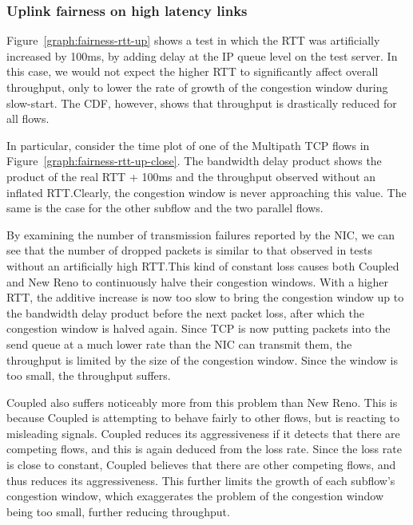 \subsubsection{Uplink fairness on high latency links}
\label{sec:fairness:latency}

Figure~\ref{graph:fairness-rtt-up} shows a test in which the RTT was
artificially increased by 100ms, by adding delay at the IP queue level on the
test server. In this case, we would not expect the higher RTT to significantly
affect overall throughput, only to lower the rate of growth of the congestion
window during slow-start. The CDF, however, shows that throughput is drastically
reduced for all flows.

In particular, consider the time plot of one of the Multipath TCP flows in
Figure~\ref{graph:fairness-rtt-up-close}. The bandwidth delay product shows the
product of the real RTT + 100ms and the throughput observed without an inflated
RTT.\@ Clearly, the congestion window is never approaching this value. The same
is the case for the other subflow and the two parallel flows.

By examining the number of transmission failures reported by the NIC, we can see
that the number of dropped packets is similar to that observed in tests without
an artificially high RTT.\@ This kind of constant loss causes both Coupled and
New Reno to continuously halve their congestion windows. With a higher RTT, the
additive increase is now too slow to bring the congestion window up to the
bandwidth delay product before the next packet loss, after which the congestion
window is halved again. Since TCP is now putting packets into the send queue at
a much lower rate than the NIC can transmit them, the throughput is limited by
the size of the congestion window. Since the window is too small, the throughput
suffers.

Coupled also suffers noticeably more from this problem than New Reno. This is
because Coupled is attempting to behave fairly to other flows, but is reacting
to misleading signals. Coupled reduces its aggressiveness if it detects that
there are competing flows, and this is again deduced from the loss rate. Since
the loss rate is close to constant, Coupled believes that there are other
competing flows, and thus reduces its aggressiveness. This further limits the
growth of each subflow's congestion window, which exaggerates the problem of the
congestion window being too small, further reducing throughput.


